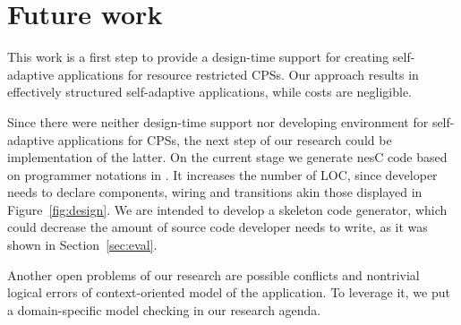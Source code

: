 \section{Future work}

This work is a first step to provide a design-time support for creating
self-adaptive applications for resource restricted CPSs. Our approach results in
effectively structured self-adaptive applications, while costs are negligible.

Since there were neither design-time support nor developing environment for
self-adaptive applications for CPSs, the next step of our research
could be implementation of the latter. On the current stage we
generate nesC code based on programmer notations in \conesc. It increases the
number of LOC, since developer needs to declare components, wiring and
transitions akin those displayed in Figure~\ref{fig:design}. We are intended to
develop a skeleton code generator, which could decrease the amount of source code
developer needs to write, as it was shown in Section~\ref{sec:eval}.

Another open problems of our research are possible conflicts and nontrivial
logical errors of context-oriented model of the application. To leverage it, we
put a domain-specific model checking in our research agenda.
